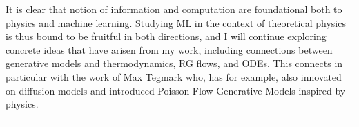 \documentclass[11pt]{article}
\begin{document}
\textbf{\color{royalblue}{Future Directions.}}
It is clear that notion of information and computation are foundational both to physics and machine learning.
Studying ML in the context of theoretical physics is thus bound to be fruitful in both directions, and I will continue exploring concrete ideas that have arisen from my work, including connections between generative models and thermodynamics, RG flows, and ODEs.
This connects in particular with the work of Max Tegmark who, has for example, also innovated on diffusion models and introduced Poisson Flow Generative Models inspired by physics.


\renewcommand{\refname}{}

\vspace{15pt}
\hrule
\vspace{-35pt}

{
    \small
    
}
\end{document}

